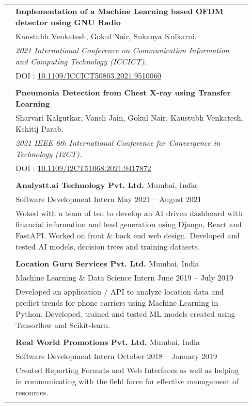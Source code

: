 \documentclass[letterpaper, 10pt]{article}
\begin{document}
\begin{longtable}{p{1.3in}p{4.8in}}
& \textbf{Implementation of a Machine Learning based OFDM detector using GNU Radio} \\
& Kaustubh Venkatesh, Gokul Nair, Sukanya Kulkarni. \\
& \textit{2021 International Conference on Communication Information and Computing Technology (ICCICT).} \\
& DOI : \href{https://ieeexplore.ieee.org/document/9510060}{10.1109/ICCICT50803.2021.9510060} \\
& \\

\newpage

& \textbf{Pneumonia Detection from Chest X-ray using Transfer Learning} \\
& Sharvari Kalgutkar, Vansh Jain, Gokul Nair, Kaustubh Venkatesh, Kshitij Parab. \\
& \textit{2021 IEEE 6th International Conference for Convergence in Technology (I2CT).}\\
& DOI : \href{https://ieeexplore.ieee.org/document/9417872}{10.1109/I2CT51068.2021.9417872}\\
\\



{\color{OliveGreen}{Industry experience}}
& {\textbf{Analystt.ai Technology Pvt. Ltd.}} \hfill Mumbai, India\\
& Software Development Intern \hfill May 2021 – August 2021 \\
& Woked with a team of ten to develop an AI driven dashboard with financial information and lead generation using Django, React and FastAPI. Worked on front \& back end web design. Developed and tested AI models, decision trees and training datasets.\\
& \\

& {\textbf{Location Guru Services Pvt. Ltd.}} \hfill Mumbai, India\\
& Machine Learning \& Data Science Intern \hfill June 2019 – July 2019 \\
& Developed an application / API to analyze location data and predict trends for phone carriers using Machine Learning in Python. Developed, trained and tested ML models created using Tensorflow and Scikit-learn. \\
& \\
 
& {\textbf{Real World Promotions Pvt. Ltd.}} \hfill Mumbai, India\\
& Software Development Intern \hfill October 2018 – January 2019 \\
& Created Reporting Formats and Web Interfaces as well as helping in communicating with the field force for effective management of  resources.\\
& \\


\end{longtable}
\end{document}
